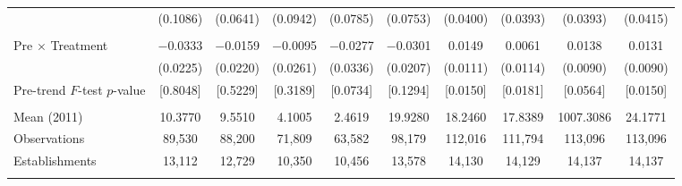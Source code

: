 \documentclass[12pt,letterpaper]{article}
\begin{document}
\begin{table}[]
\begin{threeparttable}
\begin{tabular}{lccccccccc}
  & (0.1086) & (0.0641) & (0.0942) & (0.0785) & (0.0753) & (0.0400) & (0.0393) & (0.0393) & (0.0415) \\
  &  &  &  &  &  &  &  &  & \\
Pre $\times$ Treatment & $-$0.0333 & $-$0.0159 & $-$0.0095 & $-$0.0277 & $-$0.0301 & 0.0149 & 0.0061 & 0.0138 & 0.0131 \\
  & (0.0225) & (0.0220) & (0.0261) & (0.0336) & (0.0207) & (0.0111) & (0.0114) & (0.0090) & (0.0090) \\
Pre-trend $F$-test $p$-value & [0.8048] & [0.5229] & [0.3189] & [0.0734] & [0.1294] & [0.0150] & [0.0181] & [0.0564] & [0.0150] \\
  &  &  &  &  &  &  &  &  & \\
Mean (2011) & 10.3770 & 9.5510 & 4.1005 & 2.4619 & 19.9280 & 18.2460 & 17.8389 & 1007.3086 & 24.1771 \\
Observations & 89{,}530 & 88{,}200 & 71{,}809 & 63{,}582 & 98{,}179 & 112{,}016 & 111{,}794 & 113{,}096 & 113{,}096 \\
Establishments & 13{,}112 & 12{,}729 & 10{,}350 & 10{,}456 & 13{,}578 & 14{,}130 & 14{,}129 & 14{,}137 & 14{,}137 \\
  &  &  &  &  &  &  &  &  & \\
\midrule

\end{tabular}
\end{threeparttable}
\end{table}
\end{document}
